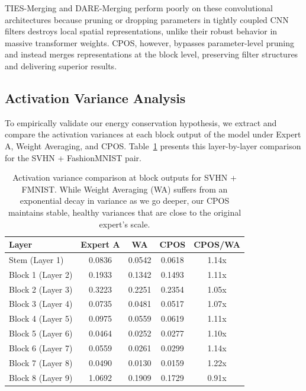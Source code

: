 \documentclass{article}
\theoremstyle{plain}
\theoremstyle{definition}
\theoremstyle{remark}
\begin{document}
TIES-Merging and DARE-Merging perform poorly on these convolutional architectures because pruning or dropping parameters in tightly coupled CNN filters destroys local spatial representations, unlike their robust behavior in massive transformer weights. CPOS, however, bypasses parameter-level pruning and instead merges representations at the block level, preserving filter structures and delivering superior results.

\subsection{Activation Variance Analysis}
To empirically validate our energy conservation hypothesis, we extract and compare the activation variances at each block output of the model under Expert A, Weight Averaging, and CPOS. Table~\ref{tab:variance} presents this layer-by-layer comparison for the SVHN + FashionMNIST pair.

\begin{table}[h]
\caption{Activation variance comparison at block outputs for SVHN + FMNIST. While Weight Averaging (WA) suffers from an exponential decay in variance as we go deeper, our CPOS maintains stable, healthy variances that are close to the original expert's scale.}
\label{tab:variance}
\begin{center}
\begin{small}
\begin{sc}
\begin{tabular}{lcccc}
\toprule
Layer & Expert A & WA & CPOS & CPOS/WA \\
\midrule
Stem (Layer 1) & 0.0836 & 0.0542 & 0.0618 & 1.14x \\
Block 1 (Layer 2) & 0.1933 & 0.1342 & 0.1493 & 1.11x \\
Block 2 (Layer 3) & 0.3223 & 0.2251 & 0.2354 & 1.05x \\
Block 3 (Layer 4) & 0.0735 & 0.0481 & 0.0517 & 1.07x \\
Block 4 (Layer 5) & 0.0975 & 0.0559 & 0.0619 & 1.11x \\
Block 5 (Layer 6) & 0.0464 & 0.0252 & 0.0277 & 1.10x \\
Block 6 (Layer 7) & 0.0559 & 0.0261 & 0.0299 & 1.14x \\
Block 7 (Layer 8) & 0.0490 & 0.0130 & 0.0159 & 1.22x \\
Block 8 (Layer 9) & 1.0692 & 0.1909 & 0.1729 & 0.91x \\
\bottomrule
\end{tabular}
\end{sc}
\end{small}
\end{center}
\end{table}
\end{document}
